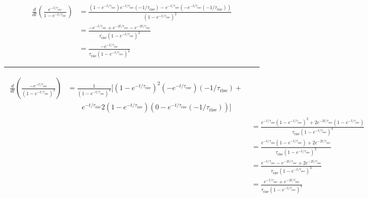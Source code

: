 \documentclass[12pt]{article}
\newcommand{\timescale}[1]{\ensuremath{\tau_\text{#1}}}
\begin{document}
\begin{subequations}\begin{align}
\frac{d}{dt} \left(\frac{
	e^{-t / \timescale{rise}}
}{
	1 - e^{-t / \timescale{rise}}
}\right) &= \frac{
	\left(1 - e^{-t / \timescale{rise}}\right) e^{-t / \timescale{rise}}
	\left(-1 / \timescale{rise}\right) -
	e^{-t / \timescale{rise}} \left(-e^{-t / \timescale{rise}}
	\left(-1 / \timescale{rise}\right)\right)
}{
	\left(1 - e^{-t / \timescale{rise}}\right)^2
}
\\
&= \frac{
	-e^{-t / \timescale{rise}} + e^{-2t / \timescale{rise}} -
	e^{-2t / \timescale{rise}}
}{
	\timescale{rise} \left(1 - e^{-t / \timescale{rise}}\right)^2
}
\\
&= \frac{
	-e^{-t / \timescale{rise}}
}{
	\timescale{rise} \left(1 - e^{-t / \timescale{rise}}\right)^2
}
\end{align}\end{subequations}

\par\null\par
\begin{center}
\rule[0.7\baselineskip]{0.5\textwidth}{0.4pt}
\end{center}

\begin{subequations}\begin{align}
\begin{split}
\frac{d}{dt}\left(\frac{
	-e^{-t / \timescale{rise}}
}{
	\left(1 - e^{-t / \timescale{rise}}\right)^2
}\right) &= \frac{1}{(1 - e^{-t / \timescale{rise}})^4}\bigg[
\left(1 - e^{-t / \timescale{rise}}\right)^2
\left(-e^{-t / \timescale{rise}}\right)
\left(-1 / \timescale{rise}\right) +
\\
&\qquad e^{-t / \timescale{rise}}
2\left(1 - e^{-t / \timescale{rise}}\right)
\left(0 - e^{-t / \timescale{rise}}\left(-1 / \timescale{rise}\right)\right)
\bigg]
\end{split}
\\
&= \frac{
	e^{-t / \timescale{rise}}
	\left(1 - e^{-t / \timescale{rise}}\right)^2 +
	2e^{-2t / \timescale{rise}}
	\left(1 - e^{-t / \timescale{rise}}\right)
}{
	\timescale{rise} \left(1 - e^{-t / \timescale{rise}}\right)^4
}
\\
&= \frac{
	e^{-t / \timescale{rise}} \left(1 - e^{-t / \timescale{rise}}\right) +
	2e^{-2t / \timescale{rise}}
}{
	\timescale{rise}\left(1 - e^{-t / \timescale{rise}}\right)^3
}
\\
&= \frac{
	e^{-t / \timescale{rise}} - e^{-2t / \timescale{rise}} +
	2e^{-2t / \timescale{rise}}
}{
	\timescale{rise} \left(1 - e^{-t / \timescale{rise}}\right)^3
}
\\
&= \frac{
	e^{-t / \timescale{rise}} + e^{-2t / \timescale{rise}}
}{
	\timescale{rise} \left(1 - e^{-t / \timescale{rise}}\right)^3
}
\end{align}\end{subequations}
\end{document}
